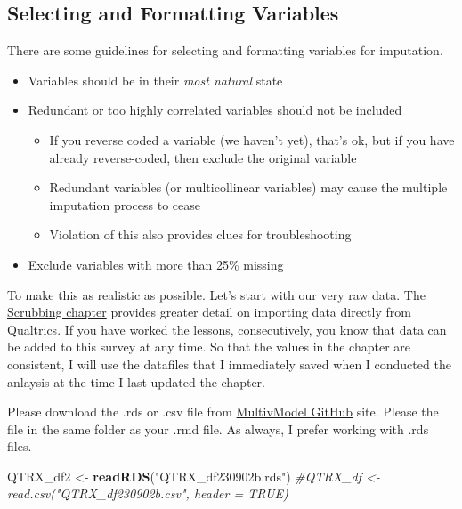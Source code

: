 \documentclass[
  11pt,
]{book}
\newenvironment{Shaded}{\begin{snugshade}}{\end{snugshade}}
\newcommand{\CommentTok}[1]{\textcolor[rgb]{0.37,0.37,0.37}{\textit{#1}}}
\newcommand{\FunctionTok}[1]{\textcolor[rgb]{0.27,0.27,0.27}{\textbf{#1}}}
\newcommand{\NormalTok}[1]{#1}
\newcommand{\OtherTok}[1]{\textcolor[rgb]{0.37,0.37,0.37}{#1}}
\newcommand{\StringTok}[1]{\textcolor[rgb]{0.5,0.5,0.5}{#1}}
\providecommand{\tightlist}{%
  \setlength{\itemsep}{0pt}\setlength{\parskip}{0pt}}
\begin{document}
\hypertarget{selecting-and-formatting-variables}{%
\subsection{Selecting and Formatting Variables}\label{selecting-and-formatting-variables}}

There are some guidelines for selecting and formatting variables for imputation.

\begin{itemize}
\tightlist
\item
  Variables should be in their \emph{most natural} state
\item
  Redundant or too highly correlated variables should not be included

  \begin{itemize}
  \tightlist
  \item
    If you reverse coded a variable (we haven't yet), that's ok, but if you have already reverse-coded, then exclude the original variable
  \item
    Redundant variables (or multicollinear variables) may cause the multiple imputation process to cease
  \item
    Violation of this also provides clues for troubleshooting
  \end{itemize}
\item
  Exclude variables with more than 25\% missing
\end{itemize}

To make this as realistic as possible. Let's start with our very raw data. The \protect\hyperlink{scrub}{Scrubbing chapter} provides greater detail on importing data directly from Qualtrics. If you have worked the lessons, consecutively, you know that data can be added to this survey at any time. So that the values in the chapter are consistent, I will use the datafiles that I immediately saved when I conducted the anlaysis at the time I last updated the chapter.

Please download the .rds or .csv file from \href{https://github.com/lhbikos/ReC_MultivModel}{MultivModel GitHub} site. Please the file in the same folder as your .rmd file. As always, I prefer working with .rds files.

\begin{Shaded}
\begin{Highlighting}[]
\NormalTok{QTRX\_df2 }\OtherTok{\textless{}{-}} \FunctionTok{readRDS}\NormalTok{(}\StringTok{"QTRX\_df230902b.rds"}\NormalTok{)}
\CommentTok{\#QTRX\_df \textless{}{-} read.csv("QTRX\_df230902b.csv", header = TRUE)}
\end{Highlighting}
\end{Shaded}
\end{document}
